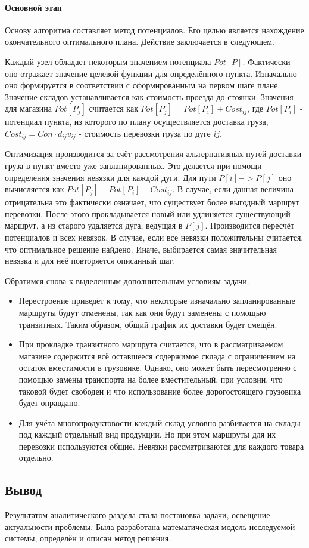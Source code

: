 	
	\paragraph{Основной этап}
	Основу алгоритма составляет метод потенциалов. Его целью является нахождение окончательного оптимального плана. Действие заключается в следующем. 
	
	Каждый узел обладает некоторым значением потенциала $Pot[P]$. Фактически оно отражает значение целевой функции для определённого пункта. Изначально оно формируется в соответствии с сформированным на первом шаге плане. Значение складов устанавливается как стоимость проезда до стоянки. Значения для магазина $Pot[P_j]$ считается как $Pot[P_j] = Pot[P_i] + Cost_{ij}$, где $Pot[P_i]$ - потенциал пункта, из которого по плану осуществляется доставка груза, $Cost_{ij} = Con \cdot d_{ij} v_{ij}$ - стоимость перевозки груза по дуге $ij$.
	
	Оптимизация производится за счёт рассмотрения альтернативных путей доставки груза в пункт вместо уже запланированных. Это делается при помощи определения значения невязки для каждой дуги. Для пути $P[i] -> P[j]$ оно вычисляется как $Pot[P_j] - Pot[P_i] - Cost_{ij}$. В случае, если данная величина отрицательна это фактически означает, что существует более выгодный маршрут перевозки. После этого прокладывается новый или удлиняется существующий маршрут, а из старого удаляется дуга, ведущая в $P[j]$. Производится пересчёт потенциалов и всех невязок. В случае, если все невязки положительны считается, что оптимальное решение найдено. Иначе, выбирается самая значительная невязка и для неё повторяется описанный шаг.
	
	Обратимся снова к выделенным дополнительным условиям задачи.
	\begin{itemize}
		\item Перестроение приведёт к тому, что некоторые изначально запланированные маршруты будут отменены, так как они будут заменены с помощью транзитных. Таким образом, общий график их доставки будет смещён.
		\item При прокладке транзитного маршрута считается, что в рассматриваемом магазине содержится всё оставшееся содержимое склада с ограничением на остаток вместимости в грузовике. Однако, оно может быть пересмотренно с помощью замены транспорта на более вместительный, при условии, что таковой будет свободен и что использование более дорогостоящего грузовика будет оправдано.
		\item Для учёта многопродуктовости каждый склад условно разбивается на склады под каждый отдельный вид продукции. Но при этом маршруты для их перевозки используются общие. Невязки рассматриваются для каждого товара отдельно.
	\end{itemize}

\subsection*{Вывод}
	Результатом аналитического раздела стала постановка задачи, освещение актуальности проблемы. Была разработана математическая модель исследуемой системы, определён и описан метод решения.
\pagebreak